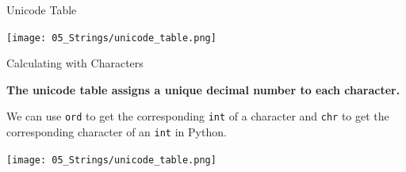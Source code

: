 \begin{frame}[fragile]{Unicode Table}

	\texttt{[image: 05\_Strings/unicode\_table.png]}


\end{frame}

\begin{frame}[fragile]{Calculating with Characters}

    \textbf{The unicode table assigns a unique decimal number to each character.}

    \vspace{1em}    

    We can use \texttt{ord} to get the corresponding \texttt{int} of a character and \texttt{chr} to get the corresponding character of an \texttt{int} in Python.

    \vspace{1em}

    \centering \texttt{[image: 05\_Strings/unicode\_table.png]}



\end{frame}


